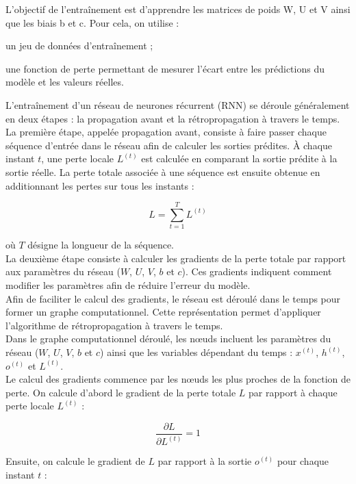 \documentclass[12pt,a4paper]{report}
\begin{document}
L’objectif de l’entraînement est d’apprendre les matrices de poids W, U et V ainsi que les biais b et c. Pour cela, on utilise :
\begin{itemizeFB}
	\item un jeu de données d’entraînement ;
	\item une fonction de perte permettant de mesurer l’écart entre les prédictions du modèle et les valeurs réelles.
\end{itemizeFB}
L’entraînement d’un réseau de neurones récurrent (RNN) se déroule généralement en deux étapes : la propagation avant et la rétropropagation à travers le temps.\\

La première étape, appelée propagation avant, consiste à faire passer chaque séquence d’entrée dans le réseau afin de calculer les sorties prédites. À chaque instant $t$, une perte locale $L^{(t)}$ est calculée en comparant la sortie prédite à la sortie réelle. La perte totale associée à une séquence est ensuite obtenue en additionnant les pertes sur tous les instants :

\[
L = \sum_{t=1}^{T} L^{(t)}
\]

où $T$ désigne la longueur de la séquence.\\

La deuxième étape consiste à calculer les gradients de la perte totale par rapport aux paramètres du réseau ($W$, $U$, $V$, $b$ et $c$). Ces gradients indiquent comment modifier les paramètres afin de réduire l’erreur du modèle.\\

Afin de faciliter le calcul des gradients, le réseau est déroulé dans le temps pour former un graphe computationnel. Cette représentation permet d’appliquer l’algorithme de rétropropagation à travers le temps.\\

Dans le graphe computationnel déroulé, les nœuds incluent les paramètres du réseau ($W$, $U$, $V$, $b$ et $c$) ainsi que les variables dépendant du temps : $x^{(t)}$, $h^{(t)}$, $o^{(t)}$ et $L^{(t)}$.\\

Le calcul des gradients commence par les nœuds les plus proches de la fonction de perte. On calcule d’abord le gradient de la perte totale $L$ par rapport à chaque perte locale $L^{(t)}$ :

\[
\frac{\partial L}{\partial L^{(t)}} = 1
\]

Ensuite, on calcule le gradient de $L$ par rapport à la sortie $o^{(t)}$ pour chaque instant $t$ :
\end{document}
